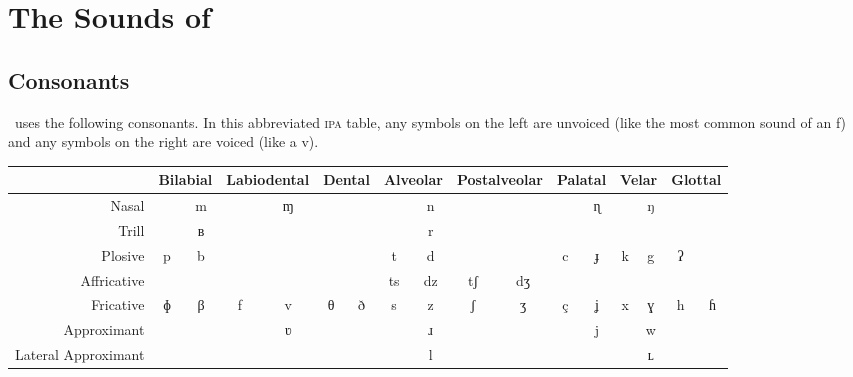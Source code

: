 
\chapter{The Sounds of \LanguageName}

\section{Consonants}

\LanguageName\ uses the following consonants.
In this abbreviated \textsc{ipa} table, any symbols on the left are unvoiced (like the most common sound of an f) and any symbols on the right are voiced (like a v).

\begin{center}
\newcommand{\head}{\fontsize{7pt}{7pt}\selectfont}
\begin{tabular}{|r|cc|cc|cccccc|cc|cc|cc|}\hline
&
\multicolumn{2}{|c|}{\head Bilabial}&
\multicolumn{2}{|c|}{\head Labiodental}&
\multicolumn{2}{|c|}{\head Dental}&
\multicolumn{2}{|c|}{\head Alveolar}&
\multicolumn{2}{|c|}{\head Postalveolar}&
\multicolumn{2}{|c|}{\head Palatal}&
\multicolumn{2}{|c|}{\head Velar}&
\multicolumn{2}{|c|}{\head Glottal}\\\hline
              {\head Nasal}& &m& &ɱ& & & &n& & & &ɳ& &ŋ&\cellcolor{gray}&\cellcolor{gray}\\\hline
              {\head Trill}& &ʙ& & & & & &r& & & & &\cellcolor{gray}&\cellcolor{gray}&\cellcolor{gray}&\cellcolor{gray}\\\hline
            {\head Plosive}&p&b& & & & &t&d& & &c&ɟ&k&g&ʔ&\cellcolor{gray}\\\hline
        {\head Affricative}& & & & & &\multicolumn{1}{c|}{}&\multicolumn{1}{|c}{ts}&\multicolumn{1}{c|}{dz}&\multicolumn{1}{|c}{tʃ}&dʒ& & & & & &\cellcolor{gray}\\\hline
          {\head Fricative}&ɸ&β&f&v&θ&\multicolumn{1}{c|}{ð}&\multicolumn{1}{|c}{s}&\multicolumn{1}{c|}{z}&\multicolumn{1}{|c}{ʃ}&ʒ&ç&ʝ&x&ɣ&h&ɦ\\\hline
        {\head Approximant}& & & &ʋ& & & &ɹ& & & &j& &w&\cellcolor{gray}&\cellcolor{gray}\\\hline
{\head Lateral Approximant}&\cellcolor{gray}&\cellcolor{gray}&\cellcolor{gray}&\cellcolor{gray}&&&&l&&&&&&ʟ&\cellcolor{gray}&\cellcolor{gray}\\\hline
\end{tabular}
\end{center}

